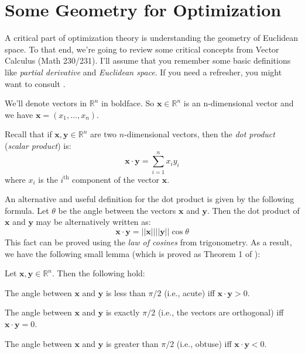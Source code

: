 \section{Some Geometry for Optimization}
A critical part of optimization theory is understanding the geometry of Euclidean space. To that end, we're going to review some critical concepts from Vector Calculus (Math 230/231). I'll assume that you remember some basic definitions like \textit{partial derivative} and \textit{Euclidean space}. If you need a refresher, you might want to consult \cite{MT03, Stew07}. 

We'll denote vectors in $\mathbb{R}^n$ in boldface. So $\mathbf{x} \in \mathbb{R}^n$ is an n-dimensional vector and we have $\mathbf{x} = (x_1,\dots,x_n)$. %
\begin{definition}
Recall that if $\mathbf{x}, \mathbf{y} \in \mathbb{R}^n$ are two $n$-dimensional vectors, then the \textit{dot product} (\textit{scalar product}) is:
\begin{equation}
\mathbf{x} \cdot \mathbf{y} = \sum_{i=1}^{n} x_i y_i
\end{equation}
where $x_i$ is the $i^\text{th}$ component of the vector $\mathbf{x}$. 
\end{definition}

An alternative and useful definition for the dot product is given by the following formula. Let $\theta$ be the angle between the vectors $\mathbf{x}$ and $\mathbf{y}$. Then the dot product of $\mathbf{x}$ and $\mathbf{y}$ may be alternatively written as:
\begin{equation}
\mathbf{x}\cdot\mathbf{y} = ||\mathbf{x}||||\mathbf{y}||\cos\theta
\end{equation}
This fact can be proved using the \textit{law of cosines} from trigonometry. As a result, we have the following small lemma (which is proved as Theorem 1 of \cite{MT03}):
\begin{lemma} Let $\mathbf{x}, \mathbf{y} \in \mathbb{R}^n$. Then the following hold:
\begin{enumerate*}
\item  The angle between $\mathbf{x}$ and $\mathbf{y}$ is less than $\pi/2$ (i.e., acute) iff $\mathbf{x}\cdot\mathbf{y} > 0$. 
\item The angle between $\mathbf{x}$ and $\mathbf{y}$ is exactly $\pi/2$ (i.e., the vectors are orthogonal) iff $\mathbf{x}\cdot\mathbf{y} = 0$. 
\item The angle between $\mathbf{x}$ and $\mathbf{y}$ is greater than $\pi/2$ (i.e., obtuse) iff $\mathbf{x}\cdot\mathbf{y} < 0$.
\end{enumerate*}
\end{lemma}


